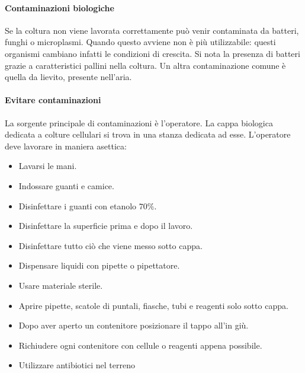 			\paragraph{Contaminazioni biologiche}
			Se la coltura non viene lavorata correttamente pu\`o venir contaminata da batteri, funghi o microplasmi.
			Quando questo avviene non \`e pi\`u utilizzabile: questi organismi cambiano infatti le condizioni di crescita.
			Si nota la presenza di batteri grazie a caratteristici pallini nella coltura.
			Un altra contaminazione comune \`e quella da lievito, presente nell'aria.

			\paragraph{Evitare contaminazioni}
			La sorgente principale di contaminazioni \`e l'operatore.
			La cappa biologica dedicata a colture cellulari si trova in una stanza dedicata ad esse.
			L'operatore deve lavorare in maniera asettica:
			\begin{multicols}{2}
				\begin{itemize}
					\item Lavarsi le mani.
					\item Indossare guanti e camice.
					\item Disinfettare i guanti con etanolo $70\%$.
					\item Disinfettare la superficie prima e dopo il lavoro.
					\item Disinfettare tutto ci\`o che viene messo sotto cappa.
					\item Dispensare liquidi con pipette o pipettatore.
					\item Usare materiale sterile.
					\item Aprire pipette, scatole di puntali, fiasche, tubi e reagenti solo sotto cappa.
					\item Dopo aver aperto un contenitore posizionare il tappo all'in gi\`u.
					\item Richiudere ogni contenitore con cellule o reagenti appena possibile.
					\item Utilizzare antibiotici nel terreno
				\end{itemize}
			\end{multicols}


